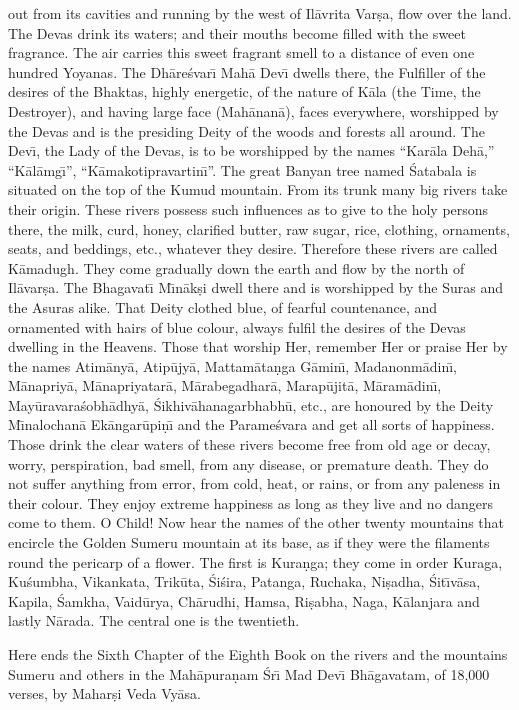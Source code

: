 out from its cavities and running by the west of Il\=avrita Var\d{s}a, flow over the land. The Devas drink its waters; and their mouths become filled with the sweet fragrance. The air carries this sweet fragrant smell to a distance of even one hundred Yoyanas. The Dh\=are\'svar\={\i} Mah\=a Dev\={\i} dwells there, the Fulfiller of the desires of the Bhaktas, highly energetic, of the nature of K\=ala (the Time, the Destroyer), and having large face (Mah\=anan\=a), faces everywhere, worshipped by the Devas and is the presiding Deity of the woods and forests all around. The Dev\={\i}, the Lady of the Devas, is to be worshipped by the names ``Kar\=ala Deh\=a,'' ``K\=al\=amg\={\i}'', ``K\=amakotipravartin\={\i}''. The great Banyan tree named \'Satabala is situated on the top of the Kumud mountain. From its trunk many big rivers take their origin. These rivers possess such influences as to give to the holy persons there, the milk, curd, honey, clarified butter, raw sugar, rice, clothing, ornaments, seats, and beddings, etc., whatever they desire. Therefore these rivers are called K\=amadugh. They come gradually down the earth and flow by the north of Il\=avar\d{s}a. The Bhagavat\={\i} M\={\i}n\=ak\d{s}i dwell there and is worshipped by the Suras and the Asuras alike. That Deity clothed blue, of fearful countenance, and ornamented with hairs of blue colour, always fulfil the desires of the Devas dwelling in the Heavens. Those that worship Her, remember Her or praise Her by the names Atim\=any\=a, Atip\=ujy\=a, Mattam\=ata\d{n}ga G\=amin\={\i}, Madanonm\=adin\={\i}, M\=anapriy\=a, M\=anapriyatar\=a, M\=arabegadhar\=a, Marap\=ujit\=a, M\=aram\=adin\={\i}, May\=uravara\'sobh\=adhy\=a, \'Sikhiv\=ahanagarbhabh\=u, etc., are honoured by the Deity M\={\i}nalochan\=a Ek\=angar\=upi\d{n}\={\i} and the Parame\'svara and get all sorts of happiness. Those drink the clear waters of these rivers become free from old age or decay, worry, perspiration, bad smell, from any disease, or premature death. They do not suffer anything from error, from cold, heat, or rains, or from any paleness in their colour. They enjoy extreme happiness as long as they live and no dangers come to them. O Child! Now hear the names of the other twenty mountains that encircle the Golden Sumeru mountain at its base, as if they were the filaments round the pericarp of a flower. The first is Kura\d{n}ga; they come in order Kuraga, Ku\'sumbha, Vikankata, Trik\=uta, \'Si\'sira, Patanga, Ruchaka, Ni\d{s}adha, \'Sit\={\i}v\=asa, Kapila, \'Samkha, Vaid\=urya, Ch\=arudhi, Hamsa, Ri\d{s}abha, Naga, K\=alanjara and lastly N\=arada. The central one is the twentieth.

Here ends the Sixth Chapter of the Eighth Book on the rivers and the mountains Sumeru and others in the Mah\=apura\d{n}am \'Sr\={\i} Mad Dev\={\i} Bh\=agavatam, of 18,000 verses, by Mahar\d{s}i Veda Vy\=asa.



